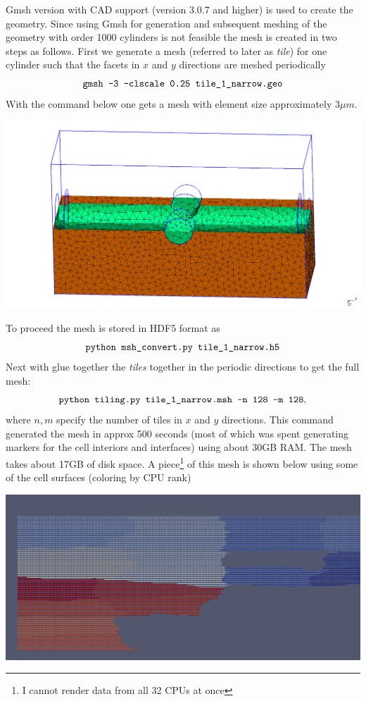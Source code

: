 \documentclass[11pt,a4paper]{article}
\begin{document}
Gmsh version with CAD support (version 3.0.7 and higher) is used to create
the geometry. Since using Gmsh for generation and subsequent meshing of the 
geometry with order 1000 cylinders is not feasible the mesh is created in two 
steps as follows. First we generate a mesh (referred to later as \emph{tile}) 
for one cylinder such that the facets in $x$ and $y$ directions are meshed periodically
\[
\texttt{gmsh -3 -clscale 0.25 tile\textunderscore 1\textunderscore narrow.geo}
\]
With the command below one gets a mesh with element size approximately 3$\mu m$.
\begin{center}
\includegraphics[width=\textwidth]{tile_1.png}
\end{center}
To proceed the mesh is stored in HDF5 format as
\[
\texttt{python msh\textunderscore convert.py tile\textunderscore 1\textunderscore narrow.h5}
\]
Next with glue together the \emph{tiles} together in the periodic directions to 
get the full mesh:
\[
\texttt{python tiling.py tile\textunderscore 1\textunderscore narrow.msh -n 128 -m 128},
\]
where $n, m$ specify the number of tiles in $x$ and $y$ directions. This command 
generated the mesh in approx 500 seconds (most of which was spent generating markers for the 
cell interiors and interfaces) using about 30GB RAM. The mesh takes about 17GB of disk space.
A piece\footnote{I cannot render data from all 32 CPUs at once} of this mesh is shown below 
using some of the cell surfaces (coloring by CPU rank) 
\begin{center}
\includegraphics[width=\textwidth]{piece.png}
\end{center}
\end{document}
